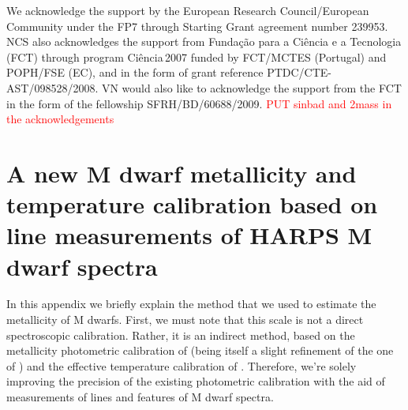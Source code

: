 \documentclass[structabstract]{aa}
\begin{document}





\begin{acknowledgements}
We acknowledge the
support by the European Research Council/European Community under the
FP7 through Starting Grant agreement number 239953. NCS also
acknowledges the support from Funda\c{c}\~ao para a Ci\^encia e a
Tecnologia (FCT) through program Ci\^encia\,2007 funded by FCT/MCTES
(Portugal) and POPH/FSE (EC), and in the form of grant reference
PTDC/CTE-AST/098528/2008. VN would also like to acknowledge the
support from the FCT in the form of the fellowship SFRH/BD/60688/2009. 
\textcolor{red}{PUT sinbad and 2mass in the acknowledgements}      


\end{acknowledgements}




\appendix

\label{appendix}

\section{A new M dwarf metallicity and temperature calibration based on line measurements of HARPS M dwarf spectra}

In this appendix we briefly explain the method that we used to estimate the metallicity of M dwarfs. First, we must note that this scale is not a direct spectroscopic calibration. Rather, it is an indirect method, based on the metallicity photometric calibration of \citet{Neves-2012} (being itself a slight refinement of the one of \citet{Schlaufman-2010}) and the effective temperature calibration of \citet{Casagrande-2008}. Therefore, we're solely improving the precision of the existing photometric calibration with the aid of measurements of lines and features of M dwarf spectra. 
\end{document}

